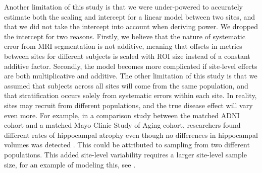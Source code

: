 Another limitation of this study is that we were under-powered to accurately estimate both the scaling and intercept for a linear model between two sites, and that we did not take the intercept into account when deriving power. We dropped the intercept for two reasons. Firstly, we believe that the nature of systematic error from MRI segmentation is not additive, meaning that offsets in metrics between sites for different subjects is scaled with ROI size instead of a constant additive factor. Secondly, the model becomes more complicated if site-level effects are both multiplicative and additive. The other limitation of this study is that we assumed that subjects across all sites will come from the same population, and that stratification occurs solely from systematic errors within each site. In reality, sites may recruit from different populations, and the true disease effect will vary even more. For example, in a comparison study between the matched ADNI cohort and a matched Mayo Clinic Study of Aging cohort, researchers found different rates of hippocampal atrophy even though no differences in hippocampal volumes was detected \cite{Whitwell_2012}. This could be attributed to sampling from two different populations. This added site-level variability requires a larger site-level sample size, for an example of modeling this, see \cite{enigmarandom}. 

